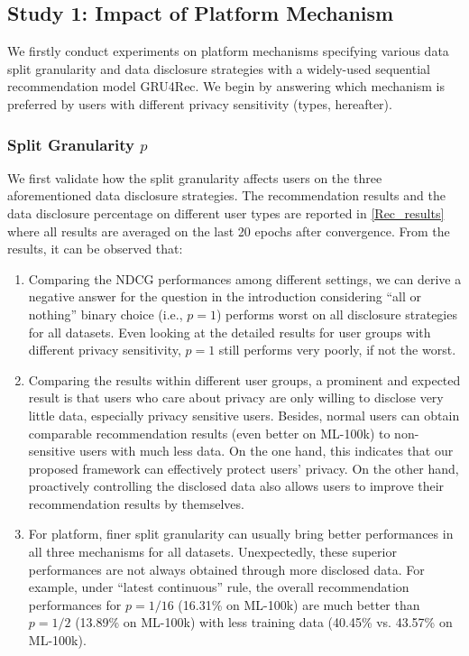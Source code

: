 



\subsection{Study 1: Impact of Platform Mechanism}


We firstly conduct experiments on platform mechanisms specifying various data split granularity and data disclosure strategies with a widely-used sequential recommendation model GRU4Rec. 
We begin by answering which mechanism is preferred by users with different privacy sensitivity (types, hereafter). 




\subsubsection{Split Granularity $p$}
We first validate how the split granularity affects users on the three aforementioned data disclosure strategies.
The recommendation results and the data disclosure percentage on different user types are reported in \cref{Rec_results} where all results are averaged on the last 20 epochs after convergence.
From the results, it can be observed that:
\begin{enumerate} [itemsep=4pt]
    \item Comparing the NDCG performances among different settings, we can derive a negative answer for the question in the introduction considering ``all or nothing'' binary choice (i.e., $p{=}1$) performs worst on all disclosure strategies for all datasets.
Even looking at the detailed results for user groups with different privacy sensitivity, $p{=}1$ still performs very poorly, if not the worst.
\item Comparing the results within different user groups, a prominent and expected result is that users who care about privacy are only willing to disclose very little data, especially privacy sensitive users.
Besides, normal users can obtain comparable recommendation results (even better on ML-100k) to non-sensitive users with much less data.
On the one hand, this indicates that our proposed framework can effectively protect users' privacy.
On the other hand, proactively controlling the disclosed data also allows users to improve their recommendation results by themselves.
\item For platform, finer split granularity can usually bring better performances in all three mechanisms for all datasets.
Unexpectedly, these superior performances are not always obtained through more disclosed data.
For example, under ``latest continuous'' rule, the overall recommendation performances for $p{=}1/16$ (16.31\% on ML-100k) are much better than $p{=}1/2$ (13.89\% on ML-100k) with less training data (40.45\% vs. 43.57\% on ML-100k).
\end{enumerate}



